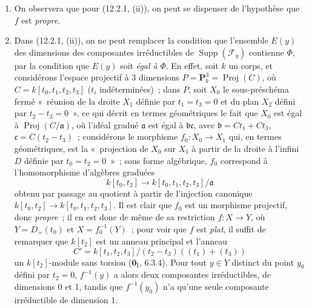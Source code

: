 \begin{remarks}[12.2.3]
\label{IV.12.2.3-fr}
\begin{enumerate}[label=(\roman*)]
  \item On observera que pour (12.2.1, (ii)), on peut se dispenser de
  l'hypothèse que $f$ est \emph{propre}.

  \item Dans (12.2.1, (ii)), on ne peut remplacer la condition que l'ensemble
  $E(y)$ des dimensions des composantes irréductibles de
  $\operatorname{Supp}(\mathcal F_y)$ contienne $\Phi$, par la condition que
  $E(y)$ soit \emph{égal à} $\Phi$. En effet, soit $k$ un corps, et considérons
  l'espace projectif à 3 dimensions $P=\mathbf P^3_k=\operatorname{Proj}(C)$,
  où $C=k[t_0,t_1,t_2,t_3]$ ($t_i$ indéterminées)~; dans $P$, soit $X_0$ le
  sous-préschéma fermé «~réunion de la droite $X_1$ définie par $t_1=t_3=0$ et
  du plan $X_2$ défini par $t_2-t_3=0$~», ce qui décrit en termes géométriques
  le fait que $X_0$ est égal à $\operatorname{Proj}(C/\mathfrak a)$, où l'idéal
  gradué $\mathfrak a$ est égal à $\mathfrak b\mathfrak c$, avec
  $\mathfrak b=Ct_1+Ct_3$, $\mathfrak c=C(t_2-t_3)$~; considérons le morphisme
  $f_0:X_0\to X_1$ qui, en termes géométriques, est la «~projection de $X_0$
  sur $X_1$ à partir de la droite à l'infini $D$ définie par $t_0=t_2=0$~»~;
  sous forme algébrique, $f_0$ correspond à l'homomorphisme d'algèbres graduées
  \[
    k[t_0,t_2]\longrightarrow k[t_0,t_1,t_2,t_3]/\mathfrak a
  \]
  obtenu par passage au quotient à partir de l'injection canonique
  $k[t_0,t_2]\to k[t_0,t_1,t_2,t_3]$. Il est clair que $f_0$ est un morphisme
  projectif, donc \emph{propre}~; il en est donc de même de sa restriction
  $f:X\to Y$, où $Y=D_+(t_0)$ et $X=f_0^{-1}(Y)$~; pour voir que $f$ est
  \emph{plat}, il suffit de remarquer que $k[t_2]$ est un anneau principal et
  l'anneau
  \[
    C'=k[t_1,t_2,t_3]/(t_2-t_3)((t_1)+(t_3))
  \]
  un $k[t_2]$-module sans torsion ($\mathbf 0_{\mathrm I}$, 6.3.4). Pour tout
  $y\in Y$ distinct du point $y_0$ défini par $t_2=0$, $f^{-1}(y)$ a alors
  deux composantes irréductibles, de dimensions 0 et 1, tandis que
  $f^{-1}(y_0)$ n'a qu'une seule composante irréductible de dimension 1.


\end{enumerate}
\end{remarks}
